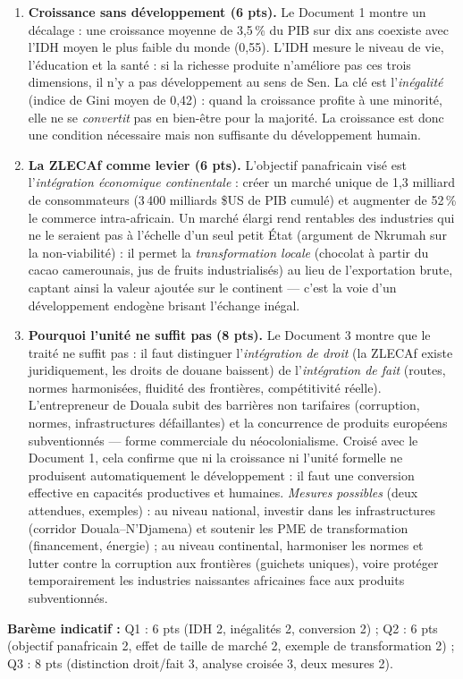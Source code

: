 \documentclass[11pt]{article}
\begin{document}
\begin{corrige}
\begin{enumerate}
\item \textbf{Croissance sans développement (6 pts).} Le Document 1 montre un décalage : une croissance moyenne de 3{,}5\,\% du PIB sur dix ans coexiste avec l'IDH moyen le plus faible du monde (0{,}55). L'IDH mesure le niveau de vie, l'éducation et la santé : si la richesse produite n'améliore pas ces trois dimensions, il n'y a pas développement au sens de Sen. La clé est l'\emph{inégalité} (indice de Gini moyen de 0{,}42) : quand la croissance profite à une minorité, elle ne se \emph{convertit} pas en bien-être pour la majorité. La croissance est donc une condition nécessaire mais non suffisante du développement humain.
\item \textbf{La ZLECAf comme levier (6 pts).} L'objectif panafricain visé est l'\emph{intégration économique continentale} : créer un marché unique de 1,3 milliard de consommateurs (3\,400 milliards \$US de PIB cumulé) et augmenter de 52\,\% le commerce intra-africain. Un marché élargi rend rentables des industries qui ne le seraient pas à l'échelle d'un seul petit État (argument de Nkrumah sur la non-viabilité) : il permet la \emph{transformation locale} (chocolat à partir du cacao camerounais, jus de fruits industrialisés) au lieu de l'exportation brute, captant ainsi la valeur ajoutée sur le continent — c'est la voie d'un développement endogène brisant l'échange inégal.
\item \textbf{Pourquoi l'unité ne suffit pas (8 pts).} Le Document 3 montre que le traité ne suffit pas : il faut distinguer l'\emph{intégration de droit} (la ZLECAf existe juridiquement, les droits de douane baissent) de l'\emph{intégration de fait} (routes, normes harmonisées, fluidité des frontières, compétitivité réelle). L'entrepreneur de Douala subit des barrières non tarifaires (corruption, normes, infrastructures défaillantes) et la concurrence de produits européens subventionnés — forme commerciale du néocolonialisme. Croisé avec le Document 1, cela confirme que ni la croissance ni l'unité formelle ne produisent automatiquement le développement : il faut une conversion effective en capacités productives et humaines. \emph{Mesures possibles} (deux attendues, exemples) : au niveau national, investir dans les infrastructures (corridor Douala–N'Djamena) et soutenir les PME de transformation (financement, énergie) ; au niveau continental, harmoniser les normes et lutter contre la corruption aux frontières (guichets uniques), voire protéger temporairement les industries naissantes africaines face aux produits subventionnés.
\end{enumerate}
\textbf{Barème indicatif :} Q1 : 6 pts (IDH 2, inégalités 2, conversion 2) ; Q2 : 6 pts (objectif panafricain 2, effet de taille de marché 2, exemple de transformation 2) ; Q3 : 8 pts (distinction droit/fait 3, analyse croisée 3, deux mesures 2).


\end{corrige}
\end{document}
